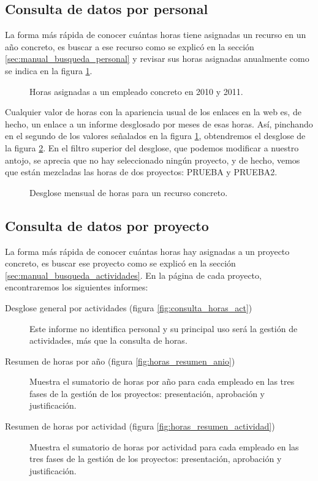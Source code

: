 \subsection{Consulta de datos por personal}

La forma más rápida de conocer cuántas horas tiene asignadas un recurso en un
año concreto, es buscar a ese recurso como se explicó en la sección
\ref{sec:manual_busqueda_personal} y revisar sus horas asignadas anualmente
como se indica en la figura \ref{fig:horas_anuales}.

\begin{figure}
\centering
{}
\caption{Horas asignadas a un empleado concreto en 2010 y 2011.}
\label{fig:horas_anuales}
\end{figure}

Cualquier valor de horas con la apariencia usual de los enlaces en la web es,
de hecho, un enlace a un informe desglosado por meses de esas horas. Así,
pinchando en el segundo de los valores señalados en la figura
\ref{fig:horas_anuales}, obtendremos el desglose de la figura
\ref{fig:desglose_horas}. En el filtro superior del desglose, que podemos
modificar a nuestro antojo, se aprecia que no hay seleccionado ningún proyecto,
y de hecho, vemos que están mezcladas las horas de dos proyectos: PRUEBA y
PRUEBA2.

\begin{figure}
\centering
{}
\caption{Desglose mensual de horas para un recurso concreto.}
\label{fig:desglose_horas}
\end{figure}

\subsection{Consulta de datos por proyecto}

La forma más rápida de conocer cuántas horas hay asignadas a un proyecto
concreto, es buscar ese proyecto como se explicó en la sección
\ref{sec:manual_busqueda_actividades}. En la página de cada proyecto,
encontraremos los siguientes informes:

\begin{description}
 \item [Desglose general por actividades (figura \ref{fig:consulta_horas_act})]
Este informe no identifica personal y su principal uso será la gestión de
actividades, más que la consulta de horas.
 \item [Resumen de horas por año (figura \ref{fig:horas_resumen_anio})] Muestra
el sumatorio de horas por año para cada empleado en las tres fases de la gestión
de los proyectos: presentación, aprobación y justificación.
 \item [Resumen de horas por actividad (figura
\ref{fig:horas_resumen_actividad})] Muestra el sumatorio de horas por actividad
para cada empleado en las tres fases de la gestión de los proyectos:
presentación, aprobación y justificación.

\end{description}

